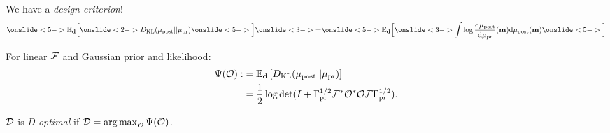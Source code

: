 \documentclass{beamer}
\begin{document}
\begin{frame}
  We have a \emph{design criterion}!  
  \begin{equation*}
    \onslide<5->{\mathbb{E}_{\data} \Big [}\onslide<2->{D_{\text{KL}} (\post || \pr )} \onslide<5->{\Big ]}
    \onslide<3->{=} \onslide<5->{\mathbb{E}_{\data} \Big [}\onslide<3->{\int \log \frac{\der \post}{\der \pr}(\param) \der \post(\param)}  \onslide<5->{\Big ]}
  \end{equation*}
\end{frame}



\begin{frame}
  \begin{theorem}\label{thm:d_optimality}
    For linear $\mathcal{F}$ and Gaussian prior and likelihood:
    \begin{align*}
      \begin{split}
        \Psi( \mathcal{O}) :&= \mathbb{E}_{\mathbf{d}}\left [ D_{\text{KL}} (\mu_{\textup{post}} || \mu_{\textup{pr}} ) \right ] \\
        &= \frac12 \log \det 
        ( I +  \Gamma_{\textup{pr}}^{1/2}  \mathcal{F} ^* \mathcal{O}^* \mathcal{O} \mathcal{F} \Gamma_{\textup{pr}}^{1/2}).
      \end{split}
    \end{align*}
  \end{theorem}

  \pause
  \begin{definition}
    \(\mathcal{D}\) is \emph{D-optimal} if \(\mathcal{D} = \operatorname*{arg\,max}_{\mathcal{O}}
    \Psi(\mathcal{O})\).
  \end{definition}


\end{frame}
\end{document}
